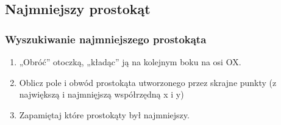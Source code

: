 \documentclass{beamer}
\begin{document}



\subsection{Najmniejszy prostokąt}

\begin{frame}
\frametitle{Wyszukiwanie najmniejszego prostokąta}
\begin{enumerate}[1)]
\item „Obróć” otoczką, „kładąc” ją na kolejnym boku na osi OX.
\item Oblicz pole i obwód prostokąta utworzonego przez skrajne punkty (z największą i najmnięjszą współrzędną x i y)
\item Zapamiętaj które prostokąty był najmniejszy.
\end{enumerate}

\end{frame}

\end{document}
